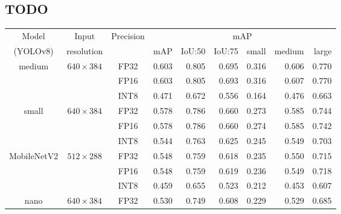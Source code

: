 \begin{appendices}




\chapter{TODO}
\label{mAPTableBig}
\begin{table}[H]
    \centering
    \small
    \begin{tabular}{|c|c|c|rrrrrr|}
        \hline
        Model & Input & \multirow{2}{*}{Precision} &  \multicolumn{6}{c|}{mAP} \\
        \cline{4-9}
        (YOLOv8)                     & resolution                       &      & mAP   & IoU:50& IoU:75& small & medium& large \\
        \hline
        \hline
        \multirow{3}{*}{medium}      & \multirow{3}{*}{$640\times384$}  & FP32 & 0.603 & 0.805 & 0.695 & 0.316 & 0.606 & 0.770 \\
                                    &                                  & FP16 & 0.603 & 0.805 & 0.693 & 0.316 & 0.607 & 0.770 \\
                                    &                                  & INT8 & 0.471 & 0.672 & 0.556 & 0.164 & 0.476 & 0.663 \\
        \hline                                                           
        \multirow{3}{*}{small}       & \multirow{3}{*}{$640\times384$}  & FP32 & 0.578 & 0.786 & 0.660 & 0.273 & 0.585 & 0.744 \\
                                    &                                  & FP16 & 0.578 & 0.786 & 0.660 & 0.274 & 0.585 & 0.742 \\
                                    &                                  & INT8 & 0.544 & 0.763 & 0.625 & 0.245 & 0.549 & 0.703 \\
        \hline
        \multirow{3}{*}{MobileNetV2} & \multirow{3}{*}{$512\times288$}  & FP32 & 0.548 & 0.759 & 0.618 & 0.235 & 0.550 & 0.715 \\
                                    &                                  & FP16 & 0.548 & 0.759 & 0.619 & 0.236 & 0.549 & 0.718 \\
                                    &                                  & INT8 & 0.459 & 0.655 & 0.523 & 0.212 & 0.453 & 0.607 \\
        \hline                      
        \multirow{9}{*}{nano}        & \multirow{3}{*}{$640\times384$}  & FP32 & 0.530 & 0.749 & 0.608 & 0.229 & 0.529 & 0.685 \\

\end{tabular}
\end{table}
\end{appendices}
